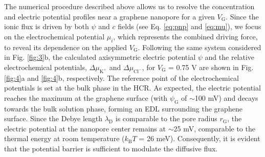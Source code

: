 \documentclass[journal=langd5,email=true, hyperref=true, keywords=false]{achemso}
\begin{document}
The numerical procedure described above allows us to resolve the
concentration and electric potential profiles near a graphene
nanopore for a given $V_{\mathrm{G}}$. Since the ionic flux is driven
by both $\psi$ and $c$ fields (see Eq. \eqref{eq:pnp} and \eqref{eq:mu}),
we focus on the electrochemical potential $\mu_{i}$, which represents
the combined driving force, to reveal its dependence on the applied
$V_{\mathrm{G}}$. Following the same system considered in Fig.
\ref{fig:3}b, the calculated axisymmetric electric potential $\psi$
and the relative electrochemical potentials,
$\Delta \mu_{\mathrm{K^{+}}}$ and $\Delta \mu_{\mathrm{Cl^{-}}}$, for
$V_{\mathrm{G}}$ = 0.75 V are shown in Fig. \ref{fig:4}a and
\ref{fig:4}b, respectively. The reference point of the electrochemical
potentials is set at the bulk phase in the HCR. As expected, the
electric potential reaches the maximum at the graphene surface (with
$\psi_{\mathrm{G}}$ of $\sim$100 mV) and decays towards the bulk
solution phase, forming an EDL surrounding the graphene surface. Since
the Debye length $\lambda_{\mathrm{D}}$ is comparable to the
pore radius $r_{\mathrm{G}}$, the electric potential at the nanopore
center remains at $\sim$25 mV, comparable to the thermal energy at
room temperature ($k_{\mathrm{B}}T$ = 26 meV). Consequently, it is
evident that the potential barrier is sufficient to modulate the
diffusive flux.
\end{document}

